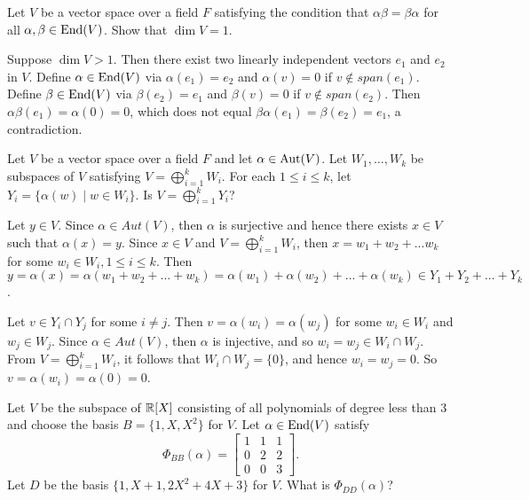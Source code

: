 \probskip

\begin{problem}[Golan 340]
Let $V$ be a vector space over a field $F$ satisfying the condition that
$\alpha\beta = \beta\alpha$ for all $\alpha, \beta \in \operatorname{End}(V)$. Show that
$\dim{V} = 1$.
\end{problem}
\smallskip
\begin{solution}

Suppose $\dim{V}>1$. Then there exist two linearly independent vectors $e_1$ and 
$e_2$ in $V$. Define $\alpha \in \operatorname{End}(V)$ via $\alpha(e_1)=e_2$ and $\alpha(v)=0$ 
if $v \notin span(e_1)$. Define $\beta \in \operatorname{End}(V)$ via $\beta(e_2)=e_1$ and 
$\beta(v)=0$ if $v \notin span(e_2)$. Then $\alpha\beta(e_1)=\alpha(0)=0$, which 
does not equal $\beta\alpha(e_1)=\beta(e_2)=e_1$, a contradiction.

\end{solution}

\probskip

\begin{problem}[Golan 354]
Let $V$ be a vector space over a field $F$ and let $\alpha \in \operatorname{Aut}(V)$.  Let
$W_1, \dots, W_k$ be subspaces of $V$ satisfying $V = \bigoplus_{i=1}^k W_i$.
For each $1\leq i \leq k$, let $Y_i = \{\alpha(w) \mid w \in W_i\}$.
Is $V = \bigoplus_{i=1}^k Y_i$?
\end{problem}
\smallskip
\begin{solution}

Let $y \in V$. Since $\alpha \in Aut(V)$, then $\alpha$ is surjective and hence 
there exists $x \in V$ such that $\alpha(x)=y$. Since $x \in V$ and 
$V = \bigoplus_{i=1}^k W_i$, then $x=w_1+w_2+...w_k$ for some $w_i \in W_i, 1 \le i \le k$. 
Then $y=\alpha(x)=\alpha(w_1+w_2+...+w_k)=\alpha(w_1)+\alpha(w_2)+...+\alpha(w_k) \in Y_1 + Y_2 + ... + Y_k$.

\smallskip

Let $v \in Y_i \cap Y_j$ for some $i \ne j$. Then $v=\alpha(w_i)=\alpha(w_j)$ 
for some $w_i \in W_i$ and $w_j \in W_j$. Since $\alpha \in Aut(V)$, then $\alpha$ 
is injective, and so $w_i=w_j \in W_i \cap W_j$. From $V = \bigoplus_{i=1}^k W_i$, 
it follows that $W_i \cap W_j = \{0\}$, and hence $w_i=w_j=0$. So $v=\alpha(w_i)=\alpha(0)=0$.

\end{solution}

\begin{ex}[Golan 415]
Let $V$ be the subspace of $\mathbb{R}[X]$ consisting of all polynomials of degree less
than 3 and choose the basis $B = \{1, X, X^2\}$ for $V$. Let $\alpha \in \operatorname{End}(V)$ satisfy
\[
\Phi_{BB}(\alpha) = 
\begin{bmatrix} 
1 & 1 & 1\\ 
0 & 2 & 2\\
0 & 0 & 3
\end{bmatrix}.
\]
Let $D$ be the basis $\{1, X+1, 2X^2 + 4X + 3\}$ for $V$.  What is $\Phi_{DD}(\alpha)$?
\end{ex}

